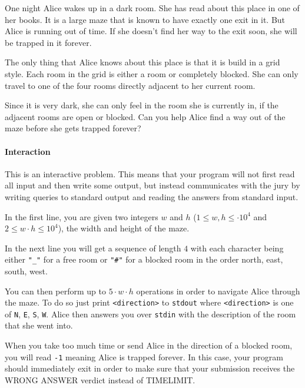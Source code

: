 



\makeheader

One night Alice wakes up in a dark room. She has read about this place in one of her books. It is a large maze that is known to have exactly one exit in it. But Alice is running out of time. If she doesn't find her way to the exit soon, she will be trapped in it forever.

The only thing that Alice knows about this place is that it is build in a grid style. Each room in the grid is either a room or completely blocked. She can only travel to one of the four rooms directly adjacent to her current room.

Since it is very dark, she can only feel in the room she is currently in, if the adjacent rooms are open or blocked. Can you help Alice find a way out of the maze before she gets trapped forever?

\paragraph*{Interaction}

This is an interactive problem. This means that your program will not first read all input and then write some output, but instead communicates with the jury by writing queries to standard output and reading the answers from standard input.

In the first line, you are given two integers $w$ and $h$ ($1 \leq w, h \leq \cdot 10^4$ and $2\leq w \cdot h \leq 10^4$), the width and height of the maze.

In the next line you will get a sequence of length $4$ with each character being either \texttt{"\_"} for a free room or \texttt{"\#"} for a blocked room in the order north, east, south, west.

You can then perform up to $5 \cdot w \cdot h$ operations in order to navigate Alice through the maze. To do so just print \texttt{<direction>} to \texttt{stdout} where \texttt{<direction>} is one of \texttt{N}, \texttt{E}, \texttt{S}, \texttt{W}. Alice then answers you over \texttt{stdin} with the description of the room that she went into. 

When you take too much time or send Alice in the direction of a blocked room, you will read \texttt{-1} meaning Alice is trapped forever. In this case, your program should immediately exit in order to make sure that your submission receives the WRONG ANSWER verdict instead of TIMELIMIT.

